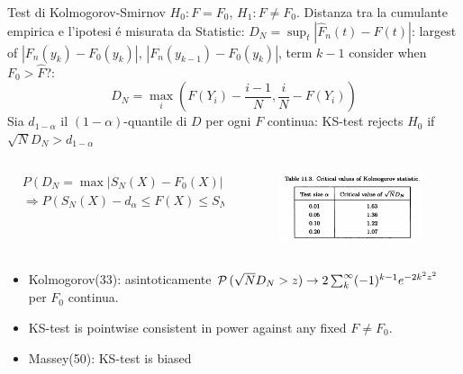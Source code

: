 \documentclass[asd-beamer.tex]{subfiles}%
\begin{document}
\begin{frame}{Test di Kolmogorov-Smirnov}
    $H_0: F=F_0$, $H_1: F\neq F_0$. Distanza tra la cumulante empirica e l'ipotesi \'e misurata da Statistic: $D_N=\sup_t{|\hat{F}_n(t)-F(t)|}$: largest of $|F_n(y_k)-F_0(y_k)|$, $|F_n(y_{k-1})-F_0(y_k)|$, term $k-1$ consider when $F_0>\hat{F}$?:
\[D_N=\max_{i}(F(Y_i)-\frac{i-1}{N},\frac{i}{N}-F(Y_i))\]
Sia $d_{1-\alpha}$ il $(1-\alpha)$-quantile di $D$ per ogni $F$ continua: KS-test rejects $H_0$ if $\sqrt{N}D_N>d_{1-\alpha}$
\begin{columns}[T]
\begin{column}{0.7\textwidth}
\begin{align*}
&P(D_N=\max|S_N(X)-F_0(X)|<d_{1-\alpha})=1-\alpha\\
&\Rightarrow P(S_N(X)-d_{\alpha}\leq F(X)\leq S_N(X)+d_{\alpha})=1-\alpha
\end{align*}
\end{column}
\begin{column}{0.3\textwidth}
\begin{figure}[!ht]\includegraphics[trim={0cm 0cm 0 0},clip, keepaspectratio,width=0.99\textwidth]{figures/james/test/gof-kolmogo-critical}\label{fig:gof-kolmogo-critical}
	\end{figure}
\end{column}
\end{columns}
\begin{itemize}
\item Kolmogorov(33): asintoticamente 
$\operatorname{\mathcal{P}}{(\sqrt{N}D_N>z)}\to2\sum_k^{\infty}(-1)^{k-1}e^{-2k^2z^2}$ per $F_0$ continua.
\item KS-test is pointwise consistent in power against any fixed $F\neq F_0$. %
\item Massey(50): KS-test is biased
\end{itemize}
\end{frame}
\end{document}
